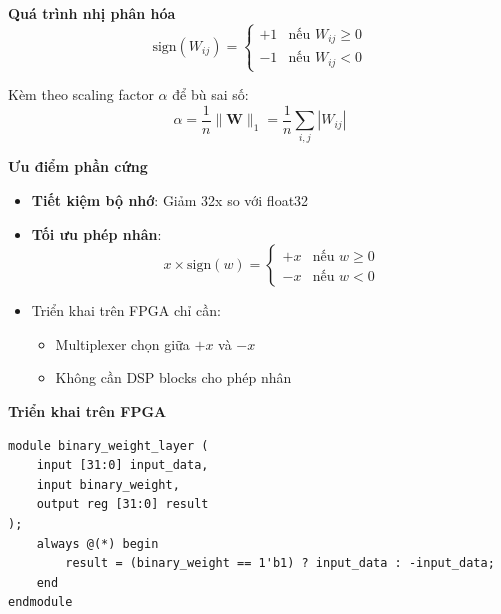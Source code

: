 \textbf{Quá trình nhị phân hóa}
\begin{equation}
    \text{sign}(W_{ij}) = \begin{cases} 
        +1 & \text{nếu } W_{ij} \geq 0 \\
        -1 & \text{nếu } W_{ij} < 0 
    \end{cases}
\end{equation}

\noindent Kèm theo scaling factor $\alpha$ để bù sai số:
\begin{equation}
    \alpha = \frac{1}{n} \|\mathbf{W}\|_1 = \frac{1}{n} \sum_{i,j} |W_{ij}|
\end{equation}

\textbf{Ưu điểm phần cứng}
\begin{itemize}
    \item \textbf{Tiết kiệm bộ nhớ}: Giảm 32x so với float32
    \item \textbf{Tối ưu phép nhân}: 
    \begin{equation}
        x \times \text{sign}(w) = \begin{cases} 
            +x & \text{nếu } w \geq 0 \\
            -x & \text{nếu } w < 0 
        \end{cases}
    \end{equation}
    \item Triển khai trên FPGA chỉ cần:
    \begin{itemize}
        \item Multiplexer chọn giữa $+x$ và $-x$
        \item Không cần DSP blocks cho phép nhân
    \end{itemize}
\end{itemize}

\textbf{Triển khai trên FPGA}
\begin{verbatim}
module binary_weight_layer (
    input [31:0] input_data,
    input binary_weight,
    output reg [31:0] result
);
    always @(*) begin
        result = (binary_weight == 1'b1) ? input_data : -input_data;
    end
endmodule
\end{verbatim}

